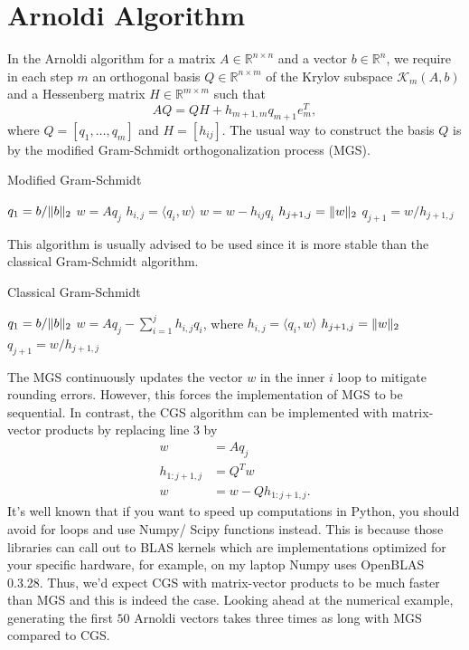 \documentclass[11pt]{article}
\newcommand{\RR}{\mathbb{R}}
\DeclarePairedDelimiter\norm{\lVert}{\rVert}
\begin{document}
\section{Arnoldi Algorithm}
In the Arnoldi algorithm for a matrix $A\in\RR^{n\times n}$ and a vector $b\in\RR^n$, we require in each step $m$ an orthogonal basis $Q\in\RR^{n\times m}$ of the Krylov subspace $\mathcal{K}_m(A,b)$ and a Hessenberg matrix $H\in\RR^{m\times m}$ such that
\[ AQ = QH + h_{m+1,m}q_{m+1}e_m^T, \]
where $Q = [q_1,\ldots,q_m]$ and $H = [h_{ij}]$.
The usual way to construct the basis $Q$ is by the modified Gram-Schmidt orthogonalization process (MGS).
\begin{algorithm}[H]
\caption{Modified Gram-Schmidt}
    \begin{algorithmic}[1]
        \State $q_1 = b/\norm{b}_2$
            \State $w = Aq_{j}$
                \State $h_{i,j} = \langle q_i, w \rangle$
                \State $w = w - h_{ij}q_i$
            \EndFor
            \State $h_{j+1,j} = \norm{w}_2$
            \State $q_{j+1} = w/h_{j+1,j}$
        \EndFor
    \end{algorithmic}
\end{algorithm}
This algorithm is usually advised to be used since it is more stable than the classical Gram-Schmidt algorithm.
\begin{algorithm}[H]
\caption{Classical Gram-Schmidt}
\begin{algorithmic}[1]
        \State $q_1 = b/\norm{b}_2$
            \State $w = Aq_{j} - \sum_{i=1}^j h_{i, j} q_i$, where $h_{i,j} = \langle q_i, w \rangle$
            \State $h_{j+1,j} = \norm{w}_2$
            \State $q_{j+1} = w/h_{j+1,j}$
        \EndFor
    \end{algorithmic}
\end{algorithm}
The MGS continuously updates the vector $w$ in the inner $i$ loop to mitigate rounding errors.
However, this forces the implementation of MGS to be sequential.
In contrast, the CGS algorithm can be implemented with matrix-vector products by replacing line 3 by
\begin{align*}
    w &= Aq_{j}\\
    h_{1:j+1, j} &= Q^Tw\\
    w &= w - Q h_{1:j+1, j}.
\end{align*}
It's well known that if you want to speed up computations in Python, you should avoid for loops and use Numpy/ Scipy functions instead.
This is because those libraries can call out to BLAS kernels which are implementations optimized for your specific hardware, for example, on my laptop Numpy uses OpenBLAS 0.3.28.
Thus, we'd expect CGS with matrix-vector products to be much faster than MGS and this is indeed the case.
Looking ahead at the numerical example, generating the first $50$ Arnoldi vectors takes three times as long with MGS compared to CGS\@.
\end{document}
